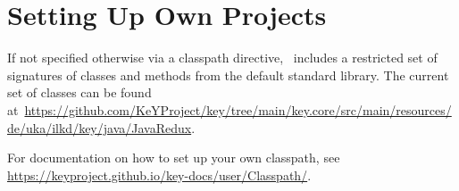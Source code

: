 \section{Setting Up Own Projects}
\label{app:configuringProjects}

If not specified otherwise via a classpath directive, \KeY\ includes a
restricted set of signatures of classes and methods from the default
standard library. The current set of classes can be found at~\url{https://github.com/KeYProject/key/tree/main/key.core/src/main/resources/de/uka/ilkd/key/java/JavaRedux}.

For documentation on how to set up your own classpath, see \url{https://keyproject.github.io/key-docs/user/Classpath/}.
	

